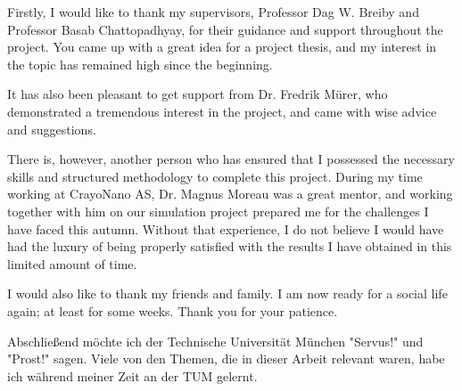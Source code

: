 Firstly, I would like to thank my supervisors, Professor Dag W. Breiby and Professor Basab Chattopadhyay, for their guidance and support throughout the project.
You came up with a great idea for a project thesis, and my interest in the topic has remained high since the beginning.

It has also been pleasant to get support from Dr. Fredrik Mürer, who demonstrated a tremendous interest in the project, and came with wise advice and suggestions.

There is, however, another person who has ensured that I possessed the necessary skills and structured methodology to complete this project.
During my time working at CrayoNano AS, Dr. Magnus Moreau was a great mentor, and working together with him on our simulation project prepared me for the challenges I have faced this autumn.
Without that experience, I do not believe I would have had the luxury of being properly satisfied with the results I have obtained in this limited amount of time.

I would also like to thank my friends and family. I am now ready for a social life again; at least for some weeks. Thank you for your patience.

Abschließend möchte ich der Technische Universität München "Servus!" und "Prost!" sagen.
Viele von den Themen, die in dieser Arbeit relevant waren, habe ich während meiner Zeit an der TUM gelernt.


\endgroup